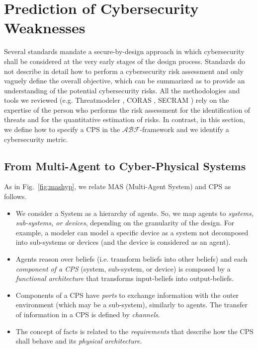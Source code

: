 \documentclass[runningheads]{llncs}
\newcommand{\assertionRegion}{\mathcal{A}}
\newcommand{\beliefRegion}{\mathcal{B}}
\newcommand{\factRegion}{\mathcal{F}}
\newcommand{\abftheory}{\assertionRegion\beliefRegion\factRegion}
\begin{document}
\section{Prediction of Cybersecurity Weaknesses}\label{sec:theory}
Several standards mandate a secure-by-design approach in which cybersecurity
shall be considered at the very early stages of the design process.
Standards do not describe in detail how to perform a cybersecurity risk 
assessment and only vaguely define the overall objective, which
can be summarized as to provide an understanding of the potential cybersecurity risks.
All the methodologies and tools we reviewed (e.g. Threatmodeler \autocite{Threatmodeler},
CORAS \autocite{Lund2010model}, SECRAM \autocite{De2015role})
rely on the expertise of the person who performs the risk assessment for
the identification of threats and for the quantitative estimation of risks.
In contrast, in this section, we define how to specify a CPS in the $\abftheory$-framework
and we identify a cybersecurity metric.

\subsection{From Multi-Agent to Cyber-Physical Systems}
As in Fig.~\ref{fig:mashyp}, we relate MAS (Multi-Agent System) and CPS as follows.
\begin{itemize}
	\item We consider a System as a hierarchy of agents. So, we map agents
		to \emph{systems, sub-systems, or devices}, depending on the
		granularity of the design. For example, a modeler can model a
		specific device as a system not decomposed into sub-systems or devices (and
		the device is considered as an agent).
	\item Agents reason over beliefs (i.e. transform beliefs into other
		beliefs) and each \emph{component of a CPS} (system, sub-system,
		or device) is composed by a \emph{functional architecture} that
		transforms input-beliefs into output-beliefs.
	\item Components of a CPS have \emph{ports} to exchange information
		with the outer environment (which may be a sub-system),
		similarly to agents. The transfer of information in a CPS is
		defined by \emph{channels}.
	\item The concept of facts is related to the \emph{requirements}
		that describe how the CPS shall behave and
		its \emph{physical architecture}.

\end{itemize}
\end{document}
